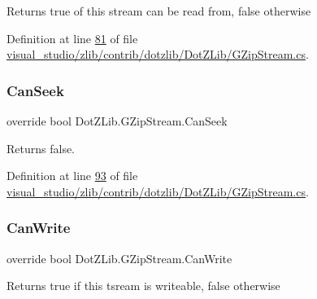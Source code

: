 Returns true of this stream can be read from, false otherwise 



Definition at line \hyperlink{visual__studio_2zlib_2contrib_2dotzlib_2_dot_z_lib_2_g_zip_stream_8cs_source_l00081}{81} of file \hyperlink{visual__studio_2zlib_2contrib_2dotzlib_2_dot_z_lib_2_g_zip_stream_8cs_source}{visual\+\_\+studio/zlib/contrib/dotzlib/\+Dot\+Z\+Lib/\+G\+Zip\+Stream.\+cs}.

\mbox{\label{class_dot_z_lib_1_1_g_zip_stream_a0444494c95dda0c7218b760af229850a}} 
\subsubsection{\texorpdfstring{Can\+Seek}{CanSeek}}
{\footnotesize\ttfamily override bool Dot\+Z\+Lib.\+G\+Zip\+Stream.\+Can\+Seek\hspace{0.3cm}{\ttfamily [get]}}



Returns false. 



Definition at line \hyperlink{visual__studio_2zlib_2contrib_2dotzlib_2_dot_z_lib_2_g_zip_stream_8cs_source_l00093}{93} of file \hyperlink{visual__studio_2zlib_2contrib_2dotzlib_2_dot_z_lib_2_g_zip_stream_8cs_source}{visual\+\_\+studio/zlib/contrib/dotzlib/\+Dot\+Z\+Lib/\+G\+Zip\+Stream.\+cs}.

\mbox{\label{class_dot_z_lib_1_1_g_zip_stream_a19296c736675fdc4210a9126431c7bf1}} 
\subsubsection{\texorpdfstring{Can\+Write}{CanWrite}}
{\footnotesize\ttfamily override bool Dot\+Z\+Lib.\+G\+Zip\+Stream.\+Can\+Write\hspace{0.3cm}{\ttfamily [get]}}



Returns true if this tsream is writeable, false otherwise 



